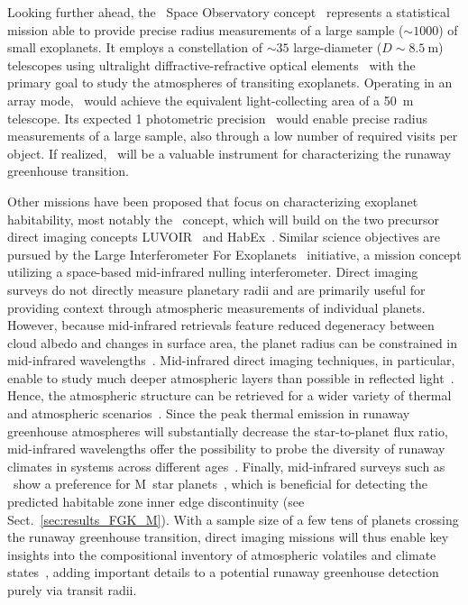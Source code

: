 \documentclass[twocolumn,twocolappendix,linenumbers]{aastex631}
\begin{document}
Looking further ahead, the \nautilus\ Space Observatory concept~\citep{Apai2019} represents a statistical mission able to provide precise radius measurements of a large sample ($\sim \num{1000}$) of small exoplanets.
It employs a constellation of $\sim \num{35}$ large-diameter ($D \sim \SI{8.5}{\meter}$) telescopes using ultralight diffractive-refractive optical elements~\citep{Milster2020} with the primary goal to study the atmospheres of transiting exoplanets.
Operating in an array mode, \nautilus\ would achieve the equivalent light-collecting area of a \SI{50}{\meter} telescope.
Its expected \SI{1}{\ppm} photometric precision~\citep{Apai2022} would enable precise radius measurements of a large sample, also through a low number of required visits per object.
If realized, \nautilus\ will be a valuable instrument for characterizing the runaway greenhouse transition.

Other missions have been proposed that focus on characterizing exoplanet habitability, most notably the \hwo\ concept, which will build on the two precursor direct imaging concepts LUVOIR~\citep{LUVOIR2019} and HabEx~\citep{Gaudi2020c}.
Similar science objectives are pursued by the Large Interferometer For Exoplanets~\citep[\life,][]{Quanz2022} initiative, a mission concept utilizing a space-based mid-infrared nulling interferometer.
Direct imaging surveys do not directly measure planetary radii and are primarily useful for providing context through atmospheric measurements of individual planets.
However, because mid-infrared retrievals feature reduced degeneracy between cloud albedo and changes in surface area, the planet radius can be constrained in mid-infrared wavelengths~\citep{2018ExA....46..543D,2021ExA...tmp..118Q}.
Mid-infrared direct imaging techniques, in particular, enable to study much deeper atmospheric layers than possible in reflected light~\citep{Wordsworth2022}.
Hence, the atmospheric structure can be retrieved for a wider variety of thermal and atmospheric scenarios~\citep{Alei2022,Konrad2022}.
Since the peak thermal emission in runaway greenhouse atmospheres will substantially decrease the star-to-planet flux ratio, mid-infrared wavelengths offer the possibility to probe the diversity of runaway climates in systems across different ages~\citep{2014ApJ...784...27L,2019A&A...621A.125B}.
Finally, mid-infrared surveys such as \life\ show a preference for M~star planets~\citep{Quanz2022}, which is beneficial for detecting the predicted habitable zone inner edge discontinuity (see Sect.~\ref{sec:results_FGK_M}).
With a sample size of a few tens of planets crossing the runaway greenhouse transition, direct imaging missions will thus enable key insights into the compositional inventory of atmospheric volatiles and climate states~\citep{2021exbi.book....5H,2022arXiv220505696C}, adding important details to a potential runaway greenhouse detection purely via transit radii.
\end{document}
